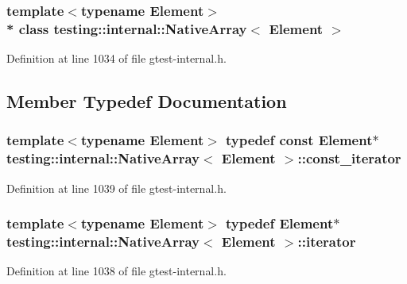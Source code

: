 \subsubsection*{template$<$typename Element$>$\\*
class testing\+::internal\+::\+Native\+Array$<$ Element $>$}



Definition at line 1034 of file gtest-\/internal.\+h.



\subsection{Member Typedef Documentation}
\subsubsection[{\texorpdfstring{const\+\_\+iterator}{const_iterator}}]{\setlength{\rightskip}{0pt plus 5cm}template$<$typename Element$>$ typedef const Element$\ast$ {\bf testing\+::internal\+::\+Native\+Array}$<$ Element $>$\+::{\bf const\+\_\+iterator}}\hypertarget{classtesting_1_1internal_1_1_native_array_a9ce7c8408460d7158a2870456d134557}{}\label{classtesting_1_1internal_1_1_native_array_a9ce7c8408460d7158a2870456d134557}


Definition at line 1039 of file gtest-\/internal.\+h.

\subsubsection[{\texorpdfstring{iterator}{iterator}}]{\setlength{\rightskip}{0pt plus 5cm}template$<$typename Element$>$ typedef Element$\ast$ {\bf testing\+::internal\+::\+Native\+Array}$<$ Element $>$\+::{\bf iterator}}\hypertarget{classtesting_1_1internal_1_1_native_array_ac1301a57977b57a1ad013e4e25fc2a72}{}\label{classtesting_1_1internal_1_1_native_array_ac1301a57977b57a1ad013e4e25fc2a72}


Definition at line 1038 of file gtest-\/internal.\+h.

